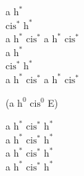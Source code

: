 \begin{chord}
    a $\mathrm{h^*}$\\
    $\mathrm{cis^*}$ $\mathrm{h^*}$\\
    a $\mathrm{h^*}$ $\mathrm{cis^*}$ a $\mathrm{h^*}$ $\mathrm{cis^*}$\\
    a $\mathrm{h^*}$\\
    $\mathrm{cis^*}$ $\mathrm{h^*}$\\
    a $\mathrm{h^*}$ $\mathrm{cis^*}$ a $\mathrm{h^*}$ $\mathrm{cis^*}$

    (a $\mathrm{h^0}$ $\mathrm{cis^0}$ E)

    \hfill\break
    \hfill\break
    \hfill\break
    \hfill\break
    \hfill\break
    a $\mathrm{h^*}$ $\mathrm{cis^*}$ $\mathrm{h^*}$\\
    a $\mathrm{h^*}$ $\mathrm{cis^*}$ $\mathrm{h^*}$\\
    a $\mathrm{h^*}$ $\mathrm{cis^*}$ $\mathrm{h^*}$\\
    a $\mathrm{h^*}$ $\mathrm{cis^*}$ $\mathrm{h^*}$
\end{chord}
